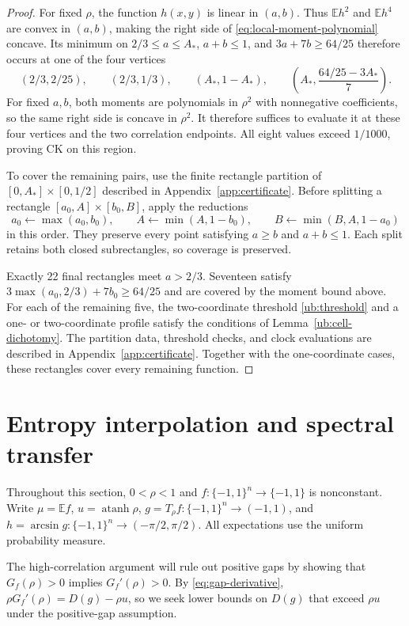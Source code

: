 \documentclass[11pt,letterpaper]{amsart}
\newcommand{\E}{\mathbb E}
\newcommand{\1}{\mathbf 1}
\DeclareMathOperator{\atanh}{atanh}
\numberwithin{equation}{section}
\begin{document}
\begin{proof}
For fixed $\rho$, the function $h(x,y)$ is linear in $(a,b)$.
Thus $\E h^2$ and $\E h^4$ are convex in $(a,b)$, making
the right side of \eqref{eq:local-moment-polynomial} concave.
Its minimum on
$2/3\le a\le A_*$, $a+b\le1$, and $3a+7b\ge64/25$
therefore occurs at one of the four vertices
\[
 (2/3,2/25),\qquad
 (2/3,1/3),\qquad
 (A_*,1-A_*),\qquad
 \left(A_*,\frac{64/25-3A_*}{7}\right).
\]
For fixed $a,b$, both moments are polynomials in $\rho^2$
with nonnegative coefficients, so the same right side is
concave in $\rho^2$.
It therefore suffices to evaluate it at these four vertices
and the two correlation endpoints.
All eight values exceed $1/1000$, proving CK on this region.

To cover the remaining pairs, use the finite rectangle partition
of $[0,A_*]\times[0,1/2]$ described in
Appendix~\ref{app:certificate}.
Before splitting a rectangle $[a_0,A]\times[b_0,B]$,
apply the reductions
\[
 a_0\leftarrow\max(a_0,b_0),\qquad
 A\leftarrow\min(A,1-b_0),\qquad
 B\leftarrow\min(B,A,1-a_0)
\]
in this order.
They preserve every point satisfying $a\ge b$ and $a+b\le1$.
Each split retains both closed subrectangles, so coverage
is preserved.

Exactly 22 final rectangles meet $a>2/3$.
Seventeen satisfy
$3\max(a_0,2/3)+7b_0\ge64/25$
and are covered by the moment bound above.
For each of the remaining five,
the two-coordinate threshold \eqref{ub:threshold}
and a one- or two-coordinate profile satisfy the conditions
of Lemma~\ref{ub:cell-dichotomy}.
The partition data, threshold checks, and clock evaluations
are described in Appendix~\ref{app:certificate}.
Together with the one-coordinate cases, these rectangles
cover every remaining function.
\end{proof}

\section{Entropy interpolation and spectral transfer}
\label{sec:full-head}

Throughout this section, $0<\rho<1$ and
$f:\{-1,1\}^n\to\{-1,1\}$ is nonconstant.
Write $\mu=\E f$, $u=\atanh\rho$,
$g=T_\rho f:\{-1,1\}^n\to(-1,1)$, and
$h=\arcsin g:\{-1,1\}^n\to(-\pi/2,\pi/2)$.
All expectations use the uniform probability measure.

The high-correlation argument will rule out positive gaps by
showing that $G_f(\rho)>0$ implies $G_f'(\rho)>0$.
By \eqref{eq:gap-derivative},
$\rho G_f'(\rho)=D(g)-\rho u$,
so we seek lower bounds on $D(g)$ that exceed $\rho u$
under the positive-gap assumption.
\end{document}
